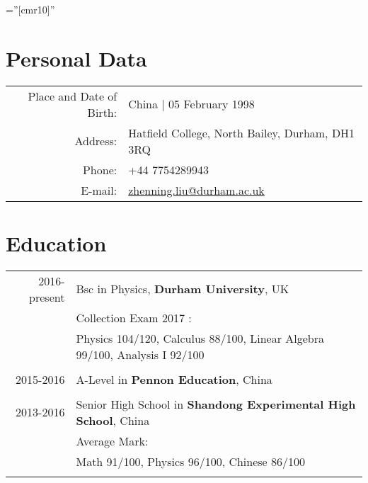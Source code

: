 \documentclass[a4paper,10pt]{article} %
\begin{document}
\pagestyle{empty} %

\font\fb=''[cmr10]'' %

\par{ \par}
\par{\bigskip\par} %

\section{Personal Data}

\begin{tabular}{rl}
Place and Date of Birth: & China  | 05 February 1998 \\
Address: & Hatfield College, North Bailey, Durham, DH1 3RQ \\
Phone: & +44 7754289943\\
E-mail: & \href{mailto:zhenning.liu@durham.ac.uk}{zhenning.liu@durham.ac.uk}
\end{tabular}


\section{Education}

\begin{tabular}{rl}	
2016-present & Bsc in Physics, \textbf{Durham University}, UK\\
& Collection Exam 2017 :\\
& Physics 104/120, Calculus 88/100, Linear Algebra 99/100, Analysis I 92/100\\
&\\


2015-2016 & \textsc{}A-Level in \normalsize\textbf{Pennon Education}, China\\
&\\

2013-2016 & Senior High School in \textbf{Shandong Experimental High School}, China\\
& Average Mark: \\
& Math 91/100, Physics 96/100, Chinese 86/100 \\
&\\


\end{tabular}
\end{document}
